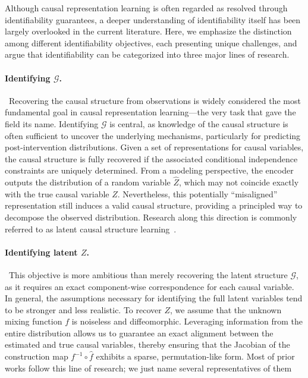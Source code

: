 \documentclass[10pt]{article}
\numberwithin{figure}{section}
\begin{document}
Although causal representation learning is often regarded as resolved through identifiability guarantees, a deeper understanding of identifiability itself has been largely overlooked in the current literature. Here, we emphasize the distinction among different identifiability objectives, each presenting unique challenges, and argue that identifiability can be categorized into three major lines of research. 

\paragraph{Identifying $\mathcal{G}$.}~Recovering the causal structure from observations is widely considered the most fundamental goal in causal representation learning—the very task that gave the field its name. Identifying $\mathcal{G}$ is central, as knowledge of the causal structure is often sufficient to uncover the underlying mechanisms, particularly for predicting post-intervention distributions. Given a set of representations for causal variables, the causal structure is fully recovered if the associated conditional independence constraints are uniquely determined. From a modeling perspective, the encoder outputs the distribution of a random variable $\hat{Z}$, which may not coincide exactly with the true causal variable $Z$. Nevertheless, this potentially “misaligned” representation still induces a valid causal structure, providing a principled way to decompose the observed distribution. Research along this direction is commonly referred to as latent causal structure learning~\citep{jiang_learning_2023,jin_learning_2023,NEURIPS2023_9d3a4cdf}.


\paragraph{Identifying latent $Z$.}~This objective is more ambitious than merely recovering the latent structure $\mathcal{G}$, as it requires an exact component-wise correspondence for each causal variable. In general, the assumptions necessary for identifying the full latent variables tend to be stronger and less realistic. To recover $Z$, we assume that the unknown mixing function $f$ is noiseless and diffeomorphic. Leveraging information from the entire distribution allows us to guarantee an exact alignment between the estimated and true causal variables, thereby ensuring that the Jacobian of the construction map $f^{-1}\circ \hat f$ exhibits a sparse, permutation-like form. Most of prior works follow this line of research; we just name several representatives of them~\citep{yao_learning_2022,zhang_causal_2024,song_temporally_2023,hyvarinen_unsupervised_2016}
\end{document}
